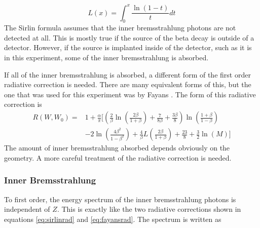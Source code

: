 \documentclass[../MaxHughesThesis.tex]{subfiles}
\begin{document}
\begin{equation}
	L(x) = \int_{0}^{x} \frac{\ln(1 - t)}{t}dt
	\label{eq:spence}
\end{equation}
The Sirlin formula assumes that the inner bremsstrahlung photons are not detected at all.
This is mostly true if the source of the beta decay is outside of a detector.
However, if the source is implanted inside of the detector, such as it is in this experiment, some of the inner bremsstrahlung is absorbed.

If all of the inner bremsstrahlung is absorbed, a different form of the first order radiative correction is needed.
There are many equivalent forms of this, but the one that was used for this experiment was by Fayans \cite{Fay86}.
The form of this radiative correction is %
\begin{equation}	
	\label{eq:fayansrad}
	\begin{split}
	R(W,W_{0}) = & 1 + \frac{\alpha}{\pi}[(\frac{2}{\beta}\ln(\frac{2\beta}{1+\beta}) + \frac{7}{8\beta} + \frac{3\beta}{8})\ln(\frac{1 + \beta}{1 - \beta}) \\
	& - 2\ln(\frac{4\beta^{2}}{1 - \beta^{2}}) + \frac{4}{\beta}L(\frac{2\beta}{1+\beta}) + \frac{23}{8} + \frac{3}{2}\ln(M)]
	\end{split}
\end{equation}
The amount of inner bremsstrahlung absorbed depends obviously on the geometry.
A more careful treatment of the radiative correction is needed.

\subsubsection{Inner Bremsstrahlung}

To first order, the energy spectrum of the inner bremsstrahlung photons is independent of $Z$.
This is exactly like the two radiative corrections shown in equations \ref{eq:sirlinrad} and \ref{eq:fayansrad}. 
The spectrum is written as \cite{Kni36}%
\end{document}
